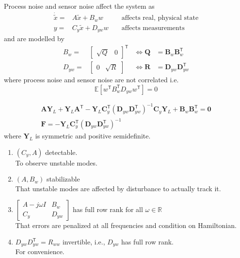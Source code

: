 \newpar{}

Process noise and sensor noise affect the system as
\begin{align*}
    \dot{\tilde{x}}= & A\tilde{x}+B_{w} w   &  & \text{ affects real, physical state} \\
    y=               & C_y\tilde{x}+D_{yw}w &  & \text{ affects measurements}
\end{align*}
and are modelled by
\begin{align*}
    B_w=    & \begin{bmatrix}\sqrt{Q}&0\end{bmatrix}^{\mathsf{T}} & \Leftrightarrow \mathbf{Q} & = \mathbf{B}_w\mathbf{B}_w^{\mathsf{T}}       \\
    D_{yw}= & \begin{bmatrix}0&\sqrt{R}\end{bmatrix}              & \Leftrightarrow \mathbf{R} & = \mathbf{D}_{yw}\mathbf{D}_{yw}^{\mathsf{T}}
\end{align*}
where process noise and sensor noise are not correlated i.e.
\begin{equation*}
    \mathbb{E}\left[w^{\mathsf{T}} B_w^{\mathsf{T}} D_{yw}w^{\mathsf{T}}\right]=0
\end{equation*}

\noindent\begin{gather*}
    \mathbf{A}\mathbf{Y}_L + \mathbf{Y}_L \mathbf{A}^{\mathsf{T}} - \mathbf{Y}_L \mathbf{C}_y^{\mathsf{T}}{\left(\mathbf{D}_{yw}\mathbf{D}_{yw}^{\mathsf{T}}\right)}^{-1} \mathbf{C}_y \mathbf{Y}_L + \mathbf{B}_w\mathbf{B}_w^{\mathsf{T}} = \mathbf{0}\\
    \mathbf{F} = -\mathbf{Y}_L\mathbf{C}_y^{\mathsf{T}}{\left(\mathbf{D}_{yw}\mathbf{D}_{yw}^{\mathsf{T}}\right)}^{-1}
\end{gather*}
where $\mathbf{Y}_L$ is symmetric and positive semidefinite.


\begin{enumerate}
    \item $(C_y,A)$ detectable.\\
          To observe unstable modes.
    \item $(A,B_w)$ stabilizable\\
          That unstable modes are affected by disturbance to actually track it.
    \item $\begin{bmatrix}A-j\omega I&B_w\\C_y&D_{yw}\end{bmatrix}$ has full row rank for all $\omega\in\mathbb{R}$\\
          That errors are penalized at all frequencies and condition on Hamiltonian.
    \item $D_{yw} D_{yw}^{\mathsf{T}}=R_{ww}$ invertible, i.e., $D_{yw}$ has full row rank.\\
          For convenience.
\end{enumerate}

